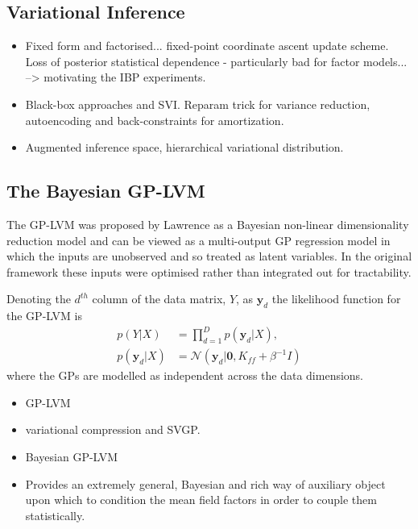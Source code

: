 \documentclass[]{article}
\begin{document}
\subsection{Variational Inference}\label{subsec:vi}

\begin{itemize}
  \item Fixed form and factorised... fixed-point coordinate ascent update scheme. Loss of posterior statistical dependence - particularly bad for factor models... --> motivating the IBP experiments.
  \item Black-box approaches and SVI. Reparam trick for variance reduction, autoencoding and back-constraints for amortization.
  \item Augmented inference space, hierarchical variational distribution.
\end{itemize}

\subsection{The Bayesian GP-LVM}\label{subsec:gplvm}

The GP-LVM was proposed by Lawrence as a Bayesian non-linear dimensionality reduction model and can be viewed as a multi-output GP regression model in which the inputs are unobserved and so treated as latent variables.
In the original framework these inputs were optimised rather than integrated out for tractability.

Denoting the $d^{th}$ column of the data matrix, $Y$, as $\mathbf{y}_d$ the likelihood function for the GP-LVM is
%
\begin{align}
  p(Y|X) &= \prod_{d=1}^D p(\mathbf{y}_d | X),\\
  p(\mathbf{y}_d|X) &= \mathcal{N}(\mathbf{y}_d|\mathbf{0}, K_{ff}+\beta^{-1}I)
\end{align}
%
where the GPs are modelled as independent across the data dimensions.

\begin{itemize}
  \item GP-LVM
  \item variational compression and SVGP.
  \item Bayesian GP-LVM
  \item Provides an extremely general, Bayesian and rich way of auxiliary object upon which to condition the mean field factors in order to couple them statistically.
\end{itemize}
\end{document}
